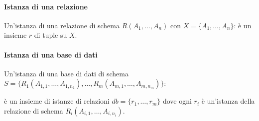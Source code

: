 \documentclass[a4paper, 10pt]{report}
\begin{document}
		\paragraph*{Istanza di una relazione} Un'istanza di una relazione di schema $R(A_1 , \dots, A_n )$ con
		$X = \{A_1 , \dots, A_n \}$:
		è un insieme $r$ di tuple su $X$.

		\paragraph*{Istanza di una base di dati} Un'istanza di una base di dati di schema 
		$S = \{R_1 (A_{1,1} , \dots,A_{1,n_1} ), \dots, R_m (A_{m,1} , \dots, A_{m,n_m} )\}$:
		
		è un insieme di istanze di relazioni $db = \{r_1 , \dots, r_m \}$
		dove ogni $r_i$ è un'istanza della relazione di schema $R_i (A_{i,1} , \dots, A_{i,n_i} )$.
			
			
			
\end{document}
